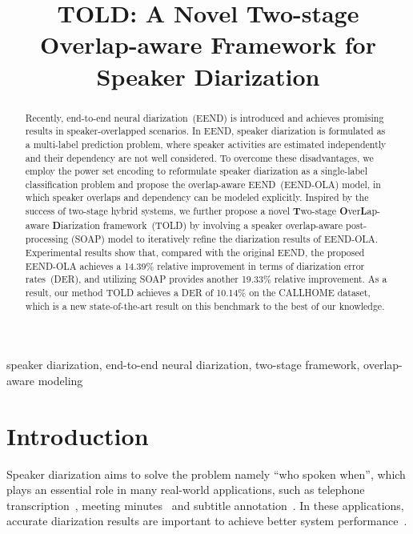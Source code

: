 \documentclass{article}
\title{TOLD: A Novel Two-stage Overlap-aware Framework for \\Speaker Diarization}
\begin{document}
\ninept
\maketitle
\begin{abstract}
Recently, end-to-end neural diarization~(EEND) is introduced and achieves promising results in speaker-overlapped scenarios. In EEND, speaker diarization is formulated as a multi-label prediction problem, where speaker activities are estimated independently and their dependency are not well considered.
To overcome these disadvantages, we employ the power set encoding to reformulate speaker diarization as a single-label classification problem and propose the overlap-aware EEND~(EEND-OLA) model, in which speaker overlaps and dependency can be modeled explicitly. Inspired by the success of two-stage hybrid systems, 
we further propose a novel \textbf{T}wo-stage \textbf{O}ver\textbf{L}ap-aware \textbf{D}iarization framework~(TOLD) by involving a speaker overlap-aware post-processing (SOAP) model to iteratively refine the diarization results of EEND-OLA.
Experimental results show that, compared with the original EEND, the proposed EEND-OLA achieves a 14.39\% relative improvement in terms of diarization error rates~(DER), and utilizing SOAP provides another 19.33\% relative improvement. As a result, our method TOLD achieves a DER of 10.14\% on the CALLHOME dataset, which is a new state-of-the-art result on this benchmark to the best of our knowledge.
\end{abstract}
\begin{keywords}
speaker diarization, end-to-end neural diarization, two-stage framework, overlap-aware modeling
\end{keywords}
\section{Introduction}
\label{sec:intro}
Speaker diarization aims to solve the problem namely ``who spoken when'', which plays an essential role in many real-world applications, such as telephone transcription~\cite{telephone_transcription}, meeting minutes~\cite{meeting_minutes} and subtitle annotation~\cite{subtitle_annotation}. In these applications, accurate diarization results are important to achieve better system performance~\cite{multi_speaker_asr2}.
\end{document}
